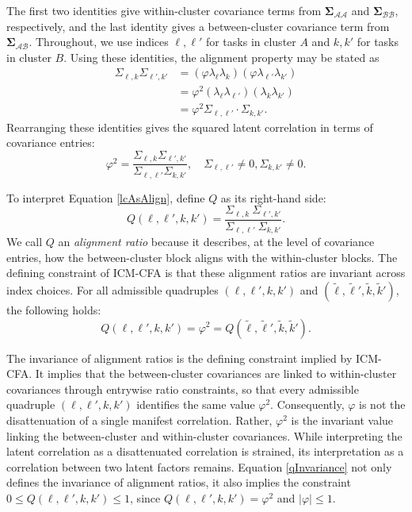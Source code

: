 \documentclass[
  american,
  man,floatsintext]{apa7}
\begin{document}
The first two identities give within-cluster covariance terms from \(\pmb\Sigma_{\mathcal{AA}}\) and \(\pmb\Sigma_{\mathcal{BB}}\), respectively, and the last identity gives a between-cluster covariance term from \(\pmb\Sigma_{\mathcal{AB}}\). Throughout, we use indices \(\ell, \ell'\) for tasks in cluster \(A\) and \(k, k'\) for tasks in cluster \(B\). Using these identities, the alignment property may be stated as
\[
\begin{aligned}
\Sigma_{\ell,k} \Sigma_{\ell',k'} &= (\varphi \lambda_\ell \lambda_k)(\varphi \lambda_{\ell'} \lambda_{k'})\\
&=
\varphi^2 (\lambda_\ell \lambda_{\ell'})(\lambda_k \lambda_{k'}) \\
&=\varphi^2 \Sigma_{\ell,\ell'} \cdot \Sigma_{k,k'}.
\end{aligned}
\]
Rearranging these identities gives the squared latent correlation in terms of covariance entries:
\begin{equation} \label{lcAsAlign}
\varphi^2 = \frac{\Sigma_{\ell,k}\Sigma_{\ell',k'}}{\Sigma_{\ell,\ell'}\Sigma_{k,k'}}, 
\quad \Sigma_{\ell,\ell'}\neq 0, \Sigma_{k,k'} \neq 0.
\end{equation}

To interpret Equation \eqref{lcAsAlign}, define \(Q\) as its right-hand side:
\begin{equation} \label{Qeq}
Q(\ell,\ell',k,k') = \frac{\Sigma_{\ell,k}\ \Sigma_{\ell',k'}}{\Sigma_{\ell,\ell'}\ \Sigma_{k,k'}}.
\end{equation}
We call \(Q\) an \emph{alignment ratio} because it describes, at the level of covariance entries, how the between-cluster block aligns with the within-cluster blocks. The defining constraint of ICM-CFA is that these alignment ratios are invariant across index choices. For all admissible quadruples \((\ell,\ell',k,k')\) and \((\tilde\ell,\tilde\ell',\tilde k,\tilde k')\), the following holds:
\begin{equation} \label{qInvariance}
Q(\ell,\ell',k,k') = \varphi^2 = Q(\tilde \ell,\tilde \ell',\tilde k,\tilde k').
\end{equation}

The invariance of alignment ratios is the defining constraint implied by ICM-CFA. It implies that the between-cluster covariances are linked to within-cluster covariances through entrywise ratio constraints, so that every admissible quadruple \((\ell,\ell',k,k')\) identifies the same value \(\varphi^2\). Consequently, \(\varphi\) is not the disattenuation of a single manifest correlation. Rather, \(\varphi^2\) is the invariant value linking the between-cluster and within-cluster covariances. While interpreting the latent correlation as a disattenuated correlation is strained, its interpretation as a correlation between two latent factors remains. Equation \eqref{qInvariance} not only defines the invariance of alignment ratios, it also implies the constraint \(0\le Q(\ell,\ell',k,k')\le 1\), since \(Q(\ell,\ell',k,k')=\varphi^2\) and \(|\varphi|\le 1\).
\end{document}
